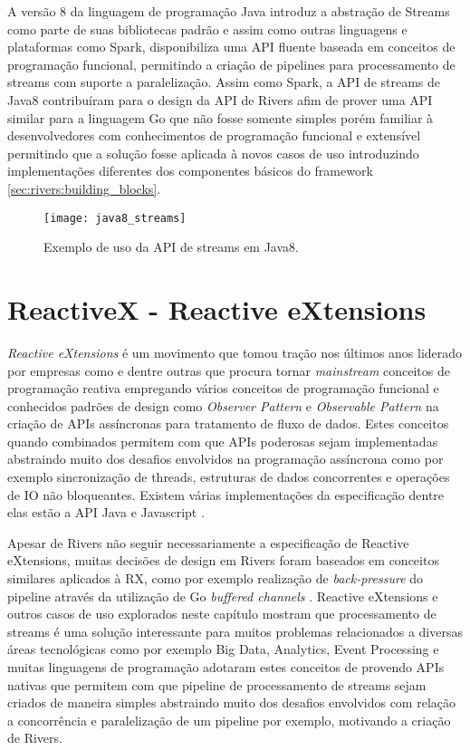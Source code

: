 A versão 8 da linguagem de programação Java introduz a abstração de Streams \cite{docs:java8:streams} como parte de suas bibliotecas padrão e assim como outras linguagens e plataformas como Spark, disponibiliza uma API fluente baseada em conceitos de programação funcional, permitindo a criação de pipelines para processamento de streams com suporte a paralelização. Assim como Spark, a API de streams de Java8 contribuíram para o design da API de Rivers afim de prover uma API similar para a linguagem Go que não fosse somente simples porém familiar à desenvolvedores com conhecimentos de programação funcional e extensível permitindo que a solução fosse aplicada à novos casos de uso introduzindo implementações diferentes dos componentes básicos do framework \ref{sec:rivers:building_blocks}.

\begin{figure}[H]
  \texttt{[image: java8\_streams]}
  \centering
  \caption{Exemplo de uso da API de streams em Java8.}
  \label{code:java8:streams}
\end{figure}

\section{ReactiveX - Reactive eXtensions}
\label{sec:reactive_extensions}

\emph{Reactive eXtensions} \cite{docs:reactivex:streams} é um movimento que tomou tração nos últimos anos liderado por empresas como \cite{netflix} e \cite{microsoft} dentre outras que procura tornar \emph{mainstream} conceitos de programação reativa \cite{article:reactive_programming} empregando vários conceitos de programação funcional e conhecidos padrões de design como \emph{Observer Pattern} \cite{article:pattern:observer} e \emph{Observable Pattern} \cite{article:pattern:observable} na criação de APIs assíncronas para tratamento de fluxo de dados. Estes conceitos quando combinados permitem com que APIs poderosas sejam implementadas abstraindo muito dos desafios envolvidos na programação assíncrona como por exemplo sincronização de threads, estruturas de dados concorrentes e operações de IO não bloqueantes. Existem várias implementações da especificação dentre elas estão a API Java \cite{docs:javarx} e Javascript \cite{docs:javascriptrx}.

Apesar de Rivers não seguir necessariamente a especificação de Reactive eXtensions, muitas decisões de design em Rivers foram baseados em conceitos similares aplicados à RX, como por exemplo realização de \emph{back-pressure} \cite{article:tim:streams} do pipeline através da utilização de Go \emph{buffered channels} \cite{docs:go:buffered_channels}. Reactive eXtensions e outros casos de uso explorados neste capítulo mostram que processamento de streams é uma solução interessante para muitos problemas relacionados a diversas áreas tecnológicas como por exemplo Big Data, Analytics, Event Processing e muitas linguagens de programação adotaram estes conceitos de provendo APIs nativas que permitem com que pipeline de processamento de streams sejam criados de maneira simples abstraindo muito dos desafios envolvidos com relação a concorrência e paralelização de um pipeline por exemplo, motivando a criação de Rivers.

